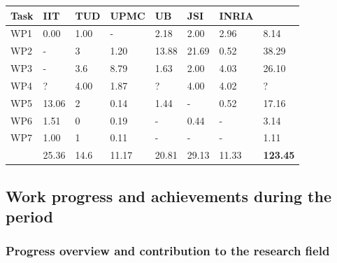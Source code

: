\documentclass[12pt,a4paper,twoside]{article}
\begin{document}
\begin{longtable}{|C{1.5cm}|C{1.5cm}|C{1.5cm}|C{1.5cm}|C{1.5cm}|C{1.5cm}|C{1.5cm}|C{1.5cm}|}
\footnotesize \textbf{Task}& \footnotesize \textbf{IIT}&\footnotesize \textbf{TUD}&\footnotesize \textbf{UPMC}& \footnotesize \textbf{UB} &\footnotesize \textbf{JSI} &\footnotesize \textbf{INRIA} &  \\ \hline
\footnotesize WP1      &  0.00     &  1.00   &  -      &  2.18   &  2.00  &  2.96  &  8.14 \\  \hline
\footnotesize WP2      &  -        &  3      &  1.20   &  13.88  &  21.69 &  0.52  &  38.29\\  \hline
\footnotesize WP3      &  -        &  3.6   &  8.79   &  1.63   &  2.00  &  4.03  &  26.10\\  \hline
\footnotesize WP4      &  ?     &  4.00     &  1.87   &  ?   &  4.00  &  4.02  &  ?\\  \hline
\footnotesize WP5      &  13.06    &  2      &  0.14   &  1.44   &  -     &  0.52  &  17.16\\  \hline
\footnotesize WP6      &  1.51     &  0      &  0.19   &  -      &  0.44  &  -     &   3.14\\  \hline
\footnotesize WP7      &  1.00     &  1      &  0.11   &  -      &  -     &  -     &   1.11\\  \hline
{}  &  25.36    &  14.6  &  11.17  &  20.81  &  29.13 &  11.33 &  \textbf{123.45}     \\  
\end{longtable}











\subsection{Work progress and achievements during the period}

\subsubsection{Progress overview and contribution to the research field}
\end{document}
